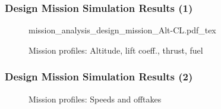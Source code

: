 \begin{frame}
 \frametitle{Design Mission Simulation Results (1)}

\hfill

 \begin{figure}
     \tiny
     \def\svgwidth{7cm}
     {mission_analysis_design_mission_Alt-CL.pdf_tex}
     \caption{\scriptsize{Mission profiles: Altitude, lift coeff., thrust, fuel}}
 \end{figure}

\end{frame}

\begin{frame}
 \frametitle{Design Mission Simulation Results (2)}

\hfill

 \begin{figure}[htb]
 \begin{center}
 \hfill
 \end{center}
 \caption{\scriptsize{Mission profiles: Speeds and offtakes}}
 \end{figure}

\end{frame}


